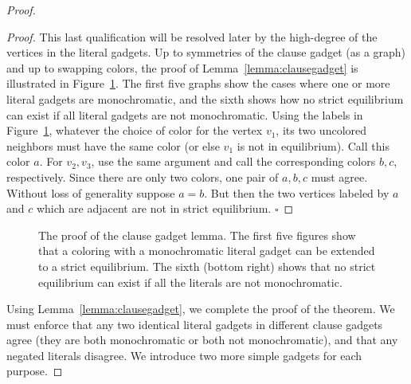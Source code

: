 \documentclass{llncs}
\begin{document}
\begin{proof}
\begin{proof}
This last qualification will be resolved later by the high-degree of the
vertices in the literal gadgets. Up to symmetries of the clause gadget (as a
graph) and up to swapping colors, the proof of Lemma~\ref{lemma:clausegadget}
is illustrated in Figure~\ref{fig:clauselemmaproof}. The first five graphs show the
cases where one or more literal gadgets are monochromatic, and the sixth shows
how no strict equilibrium can exist if all literal gadgets are not
monochromatic. Using the labels in Figure~\ref{fig:clauselemmaproof}, whatever
the choice of color for the vertex $v_1$, its two uncolored neighbors must have
the same color (or else $v_1$ is not in equilibrium). Call this color $a$. For
$v_2, v_3$, use the same argument and call the corresponding colors $b, c$,
respectively. Since there are only two colors, one pair of $a,b,c$ must agree.
Without loss of generality suppose $a=b$. But then the two vertices labeled by
$a$ and $c$ which are adjacent are not in strict equilibrium.
\hfill $\square$
\end{proof}

\begin{figure}[bth]
\centering
{}
\caption{The proof of the clause gadget lemma. The first five figures show
that a coloring with a monochromatic literal gadget can be extended to a strict
equilibrium. The sixth (bottom right) shows that no strict equilibrium can
exist if all the literals are not monochromatic.}
\label{fig:clauselemmaproof}
\end{figure}

Using Lemma~\ref{lemma:clausegadget}, we complete the proof of the theorem. We
must enforce that any two identical literal gadgets in different clause gadgets
agree (they are both monochromatic or both not monochromatic), and that any
negated literals disagree. We introduce two more simple gadgets for each
purpose.


\end{proof}
\end{document}
